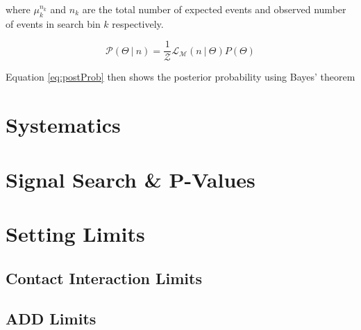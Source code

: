     where $\mu^{n_{k}}_{k}$ and $n_{k}$ are the total number of expected events and observed number of events in search bin $k$ respectively. 


	\begin{equation}
		\mathcal{P}(\Theta~|~n) = \frac{1}{\mathcal{Z}}\mathcal{L}_{\mathcal{M}}(n~|~\Theta)P(\Theta)
    	\label{eq:postProb}
    \end{equation}

    Equation \ref{eq:postProb} then shows the posterior probability using Bayes' theorem 




\section{Systematics}


\section{Signal Search \& P-Values}



\section{Setting Limits}

\subsection{Contact Interaction Limits}

\subsection{ADD Limits}


